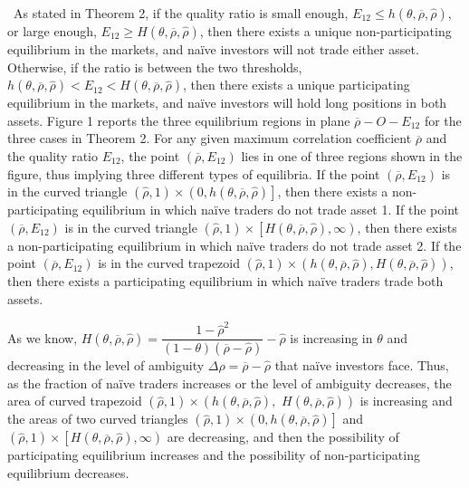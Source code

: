 \documentclass[10pt]{article}
\begin{document}
\quad \ 
As stated in Theorem 2, if the quality ratio is small enough, $ E_{1 2} \leqslant h (\theta, \overline{\rho}, {\hat \rho}) $, or large enough, $ E_{1 2} \geqslant H (\theta, \overline{\rho}, {\hat \rho}) $, then there exists a unique non-participating equilibrium in the markets, and na\"ive investors will not trade either asset. Otherwise, if the ratio is between the two thresholds, $ h (\theta, \overline{\rho}, {\hat \rho}) < E_{1 2} < H (\theta, \overline{\rho}, {\hat \rho}) $, then there exists a unique participating equilibrium in the markets, and na\"ive investors will hold long positions in both assets. Figure 1 reports the three equilibrium regions in plane $ \overline{\rho} - O - E_{1 2} $ for the three cases in Theorem 2. For any given maximum correlation coefficient $ \overline{\rho} $ and the quality ratio $ E_{1 2} $, the point $ \left( \overline{\rho}, E_{1 2} \right) $ lies in one of three regions shown in the figure, thus implying three different types of equilibria. If the point $ \left( \overline{\rho}, E_{1 2} \right) $ is in the curved triangle $ (\hat{\rho}, 1) \times \left( 0, h (\theta, \overline{\rho}, {\hat \rho}) \right] $, then there exists a non-participating equilibrium in which na\"ive traders do not trade asset 1. If the point $ \left( \overline{\rho}, E_{1 2} \right) $ is in the curved triangle $ (\hat{\rho}, 1) \times \left[ H (\theta, \overline{\rho}, {\hat \rho}), \infty \right) $, then there exists a non-participating equilibrium in which na\"ive traders do not trade asset 2. If the point $ \left( \overline{\rho}, E_{1 2} \right) $ is in the curved trapezoid $ (\hat{\rho}, 1) \times \left( h (\theta, \overline{\rho}, {\hat \rho}), H (\theta, \overline{\rho}, {\hat \rho}) \right) $, then there exists a participating equilibrium in which na\"ive traders trade both assets.

As we know, $ H (\theta, \overline{\rho}, {\hat \rho}) = \dfrac{1 - {\hat \rho}^2}{(1 - \theta) (\overline{\rho} - {\hat \rho})} - {\hat \rho} $ is increasing in $ \theta $ and decreasing in the level of ambiguity $ \Delta \rho = \overline{\rho} - \hat{\rho} $ that na\"ive investors face. Thus, as the fraction of na\"ive traders increases or the level of ambiguity decreases, the area of curved trapezoid $ (\hat{\rho}, 1) \times \left( h (\theta, \overline{\rho}, {\hat \rho}), \right. $ $ \left. H (\theta, \overline{\rho}, {\hat \rho}) \right) $ is increasing and the areas of two curved triangles $ (\hat{\rho}, 1) \times \left( 0, h (\theta, \overline{\rho}, {\hat \rho}) \right] $ and $ (\hat{\rho}, 1) \times \left[ H (\theta, \overline{\rho}, {\hat \rho}), \infty \right) $ are decreasing, and then the possibility of participating equilibrium increases and the possibility of non-participating equilibrium decreases. 
\end{document}
